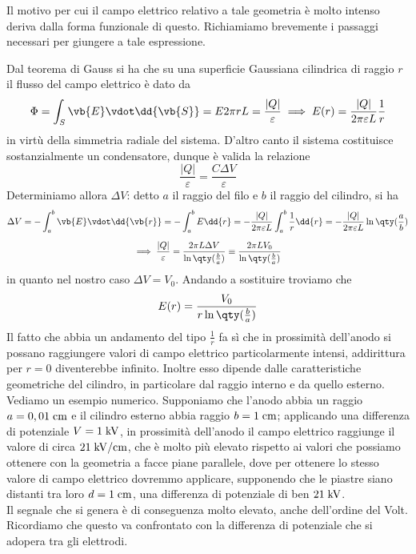 \begin{esempio}
   Il motivo per cui il campo elettrico relativo a tale geometria è molto intenso deriva dalla forma funzionale di questo. Richiamiamo brevemente i passaggi necessari per giungere a tale espressione.

   Dal teorema di Gauss si ha che su una superficie Gaussiana cilindrica di raggio $r$ il flusso del campo elettrico è dato da
   \begin{equation*}
      \Phi
      =\int_{S} \vb{E} \vdot \dd{\vb{S}}
      =E2\pi r L
      =\frac{|Q|}{\varepsilon}
      \implies
      E(r)=\frac{|Q|}{2\pi\varepsilon L} \frac{1}{r}
   \end{equation*}
   in virtù della simmetria radiale del sistema. D'altro canto il sistema costituisce sostanzialmente un condensatore, dunque è valida la relazione
   \begin{equation*}
      \frac{|Q|}{\varepsilon}
      =\frac{C \Delta V}{\varepsilon}
   \end{equation*}
   Determiniamo allora $\Delta V$: detto $a$ il raggio del filo e $b$ il raggio del cilindro, si ha
   \begin{gather*}
      \Delta V
      =-\int_{a}^{b} \vb{E} \vdot \dd{\vb{r}}
      =-\int_{a}^{b} E \dd{r}
      =-\frac{|Q|}{2\pi\varepsilon L} \int_{a}^{b} \frac{1}{r} \dd{r}
      =-\frac{|Q|}{2\pi\varepsilon L} \ln\qty(\frac{a}{b})
      \\[0.2cm]
      \implies
      \frac{|Q|}{\varepsilon}
      =\frac{2\pi L \Delta V}{\ln\qty(\frac{b}{a})}
      \equiv \frac{2\pi L V_0}{\ln\qty(\frac{b}{a})}
   \end{gather*}
   in quanto nel nostro caso $\Delta V=V_0$. Andando a sostituire troviamo che
   \begin{equation*}
      E(r)=\frac{V_0}{r \ln\qty(\frac{b}{a})}
   \end{equation*}
   Il fatto che abbia un andamento del tipo $\frac{1}{r}$ fa sì che in prossimità dell'anodo si possano raggiungere valori di campo elettrico particolarmente intensi, addirittura per $r=0$ diventerebbe infinito. Inoltre esso dipende dalle caratteristiche geometriche del cilindro, in particolare dal raggio interno e da quello esterno.\\
   Vediamo un esempio numerico. Supponiamo che l'anodo abbia un raggio $a=0,01 \; \rm cm$ e il cilindro esterno abbia raggio $b=1 \; \rm cm$; applicando una differenza di potenziale $V=1 \; \rm kV$, in prossimità dell'anodo il campo elettrico raggiunge il valore di circa $21 \; \rm kV/cm$, che è molto più elevato rispetto ai valori che possiamo ottenere con la geometria a facce piane parallele, dove per ottenere lo stesso valore di campo elettrico dovremmo applicare, supponendo che le piastre siano distanti tra loro $d=1 \; \rm cm$, una differenza di potenziale di ben $21 \; \rm kV$.\\
   Il segnale che si genera è di conseguenza molto elevato, anche dell'ordine del Volt. Ricordiamo che questo va confrontato con la differenza di potenziale che si adopera tra gli elettrodi.
\end{esempio}

